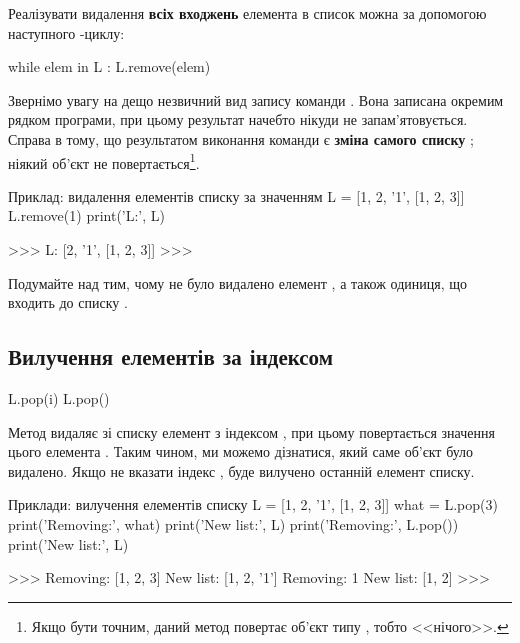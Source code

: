 Реалізувати видалення \textbf{всіх входжень} елемента в список можна за допомогою наступного -циклу:
\begin{py}{}
while elem in L :
L.remove(elem)
\end{py}

Звернімо увагу на дещо незвичний вид запису команди . Вона записана окремим рядком програми, при цьому результат начебто нікуди не запам'ятовується. Справа в тому, що результатом виконання команди є \textbf{зміна самого списку }; ніякий об'єкт  не повертається\footnote{Якщо бути точним, даний метод повертає об'єкт типу , тобто <<нічого>>.}.

\begin{pyr}{}
\begin{py}{Приклад: видалення елементів списку за значенням}
L = [1, 2, '1', [1, 2, 3]]
L.remove(1)
print('L:', L)
\end{py}
\tcblower
\begin{py}{}
>>>
L: [2, '1', [1, 2, 3]]
>>>
\end{py}
\end{pyr}
\noindent Подумайте над тим, чому не було видалено елемент , а також одиниця, що входить до списку \mi{[1, 2, 3]}.


\subsection{Вилучення елементів за індексом} \label{pop}

\begin{pydef}
L.pop(i)
L.pop()
\end{pydef}

Метод видаляє зі списку  елемент з індексом \mi{[i]}, при цьому повертається значення цього елемента . Таким чином, ми можемо дізнатися, який саме об'єкт було видалено. Якщо не вказати індекс \mi{[i]}, буде вилучено останній елемент списку.

\begin{pyr}{}
\begin{py}{Приклади: вилучення елементів списку}
L = [1, 2, '1', [1, 2, 3]]
what = L.pop(3)
print('Removing:', what)
print('New list:', L)
print('Removing:', L.pop())
print('New list:', L)
\end{py}
\tcblower
\begin{py}{}
>>>
Removing: [1, 2, 3]
New list: [1, 2, '1']
Removing: 1
New list: [1, 2]
>>>
\end{py}
\end{pyr}

